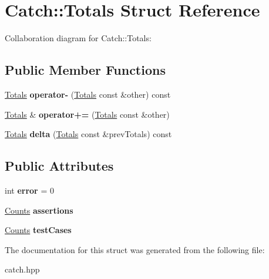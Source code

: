 \hypertarget{structCatch_1_1Totals}{}\section{Catch\+:\+:Totals Struct Reference}
\label{structCatch_1_1Totals}


Collaboration diagram for Catch\+:\+:Totals\+:
\subsection*{Public Member Functions}
\begin{DoxyCompactItemize}
\item 
\hyperlink{structCatch_1_1Totals}{Totals} {\bfseries operator-\/} (\hyperlink{structCatch_1_1Totals}{Totals} const \&other) const \hypertarget{structCatch_1_1Totals_abe15cd8a82ba9a4868dd7a542add827c}{}\label{structCatch_1_1Totals_abe15cd8a82ba9a4868dd7a542add827c}

\item 
\hyperlink{structCatch_1_1Totals}{Totals} \& {\bfseries operator+=} (\hyperlink{structCatch_1_1Totals}{Totals} const \&other)\hypertarget{structCatch_1_1Totals_a574015076e54cc405c70b053e3356e43}{}\label{structCatch_1_1Totals_a574015076e54cc405c70b053e3356e43}

\item 
\hyperlink{structCatch_1_1Totals}{Totals} {\bfseries delta} (\hyperlink{structCatch_1_1Totals}{Totals} const \&prev\+Totals) const \hypertarget{structCatch_1_1Totals_a3dee0f599c081a8360c0112fb1dafe8f}{}\label{structCatch_1_1Totals_a3dee0f599c081a8360c0112fb1dafe8f}

\end{DoxyCompactItemize}
\subsection*{Public Attributes}
\begin{DoxyCompactItemize}
\item 
int {\bfseries error} = 0\hypertarget{structCatch_1_1Totals_a6ea14c7de7ea735a14f172a26e08a239}{}\label{structCatch_1_1Totals_a6ea14c7de7ea735a14f172a26e08a239}

\item 
\hyperlink{structCatch_1_1Counts}{Counts} {\bfseries assertions}\hypertarget{structCatch_1_1Totals_a885ded66df752147b30c3d45aa602ec9}{}\label{structCatch_1_1Totals_a885ded66df752147b30c3d45aa602ec9}

\item 
\hyperlink{structCatch_1_1Counts}{Counts} {\bfseries test\+Cases}\hypertarget{structCatch_1_1Totals_adb195fe477aedee2ecea88c888f16506}{}\label{structCatch_1_1Totals_adb195fe477aedee2ecea88c888f16506}

\end{DoxyCompactItemize}


The documentation for this struct was generated from the following file\+:\begin{DoxyCompactItemize}
\item 
catch.\+hpp\end{DoxyCompactItemize}
